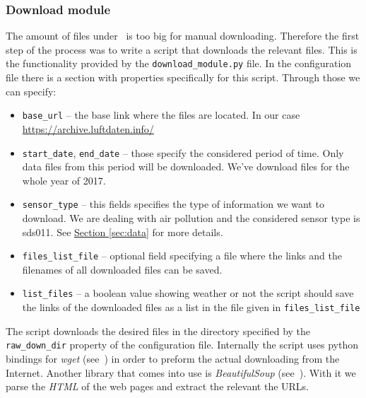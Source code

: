 \documentclass[12pt,a4paper,twoside]{scrartcl}
\numberwithin{equation}{section}
\newcommand{\refsec}[1]{\hyperref[#1]{Section \ref*{#1}}}
\begin{document}
\subsubsection{Download module}\label{sec:down-module}
The amount of files under~\cite{luftdaten} is too big for manual downloading. Therefore the first step of the process was to write a script that downloads the relevant files. This is the functionality provided by the \texttt{download\_module.py} file. In the configuration file there is a section with properties specifically for this script. Through those we can specify:
\begin{itemize}
\item \texttt{base\_url} -- the base link where the files are located. In our case \url{https://archive.luftdaten.info/}
\item \texttt{start\_date}, \texttt{end\_date} -- those specify the considered period of time. Only data files from this period will be downloaded. We've download files for the whole year of 2017.
\item \texttt{sensor\_type} -- this fields specifies the type of information we want to download. We are dealing with air pollution and the considered sensor type is sds011. See \refsec{sec:data} for more details.
\item \texttt{files\_list\_file} -- optional field specifying a file where the links and the filenames of all downloaded files can be saved.
\item \texttt{list\_files} -- a boolean value showing weather or not the script should save the links of the downloaded files as a list in the file given in \texttt{files\_list\_file}
\end{itemize}
The script downloads the desired files in the directory specified by the \texttt{raw\_down\_dir} property of the configuration file. Internally the script uses python bindings for \emph{wget} (see~\cite{wget}) in order to preform the actual downloading from the Internet. Another library that comes into use is \emph{BeautifulSoup} (see~\cite{bs}). With it we parse the \emph{HTML} of the web pages and extract the relevant the URLs.
\end{document}
